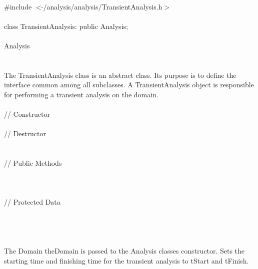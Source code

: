 
   \\
\indent \#include $<\tilde{ }$/analysis/analysis/TransientAnalysis.h$>$  \\

  \\
\indent class TransientAnalysis: public Analysis;  \\

 \\
\indent Analysis \\
\indent{} \\

 \\ 
\indent The TransientAnalysis class is an abstract class. Its purpose is
to define the interface common among all subclasses. A TransientAnalysis
object is responsible for performing a transient analysis on the domain. \\


 \\
\indent // Constructor \\
\\  
\indent // Destructor \\
\\ \\
\indent // Public Methods\\
\\
\\ \\
\indent // Protected Data \\
 \\
 \\

 \\
\\  
The Domain \p theDomain is passed to the Analysis classes
constructor. Sets the starting time and finishing time for the
transient analysis to \p tStart and \p tFinish. \\

